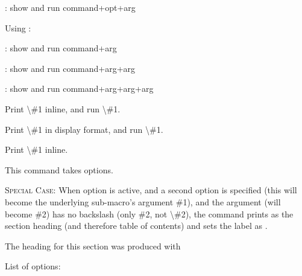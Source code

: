 \documentclass{article}
\begin{document}
\bigskip
{}

\cs{\cssom}: show and run command+opt+arg


Using :


\bigskip
\cdrd{\cssm}

\cs{\cssm}: show and run command+arg



\bigskip
\cdrd{\cssmm}

\cs{\cssmm}: show and run command+arg+arg


\bigskip
\cdrd{\cssmmm}

\cs{\cssmmm}: show and run command+arg+arg+arg


\bigskip
{}

Print \textbackslash \#1 inline, and run \textbackslash \#1.


\bigskip
{}

Print \textbackslash \#1 in display format, and run \textbackslash \#1.



\bigskip
{}

Print \textbackslash \#1 inline. 

This command takes options.

\textsc{Special Case:} When option  is active, and a second option  is specified (this will become the underlying sub-macro's argument \#1), and the argument (will become \#2) has no backslash (only \#2, not \textbackslash \#2), the command prints  as the section heading (and therefore table of contents) and sets the label as .

The heading for this section was produced with 

\bigskip
List of  options:
\end{document}
